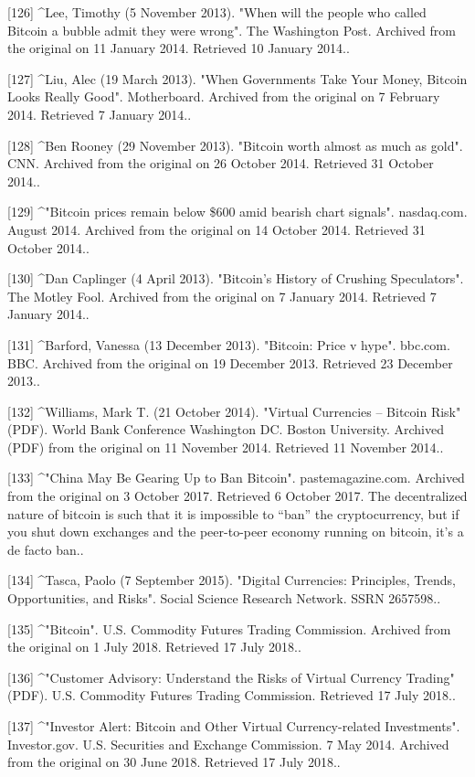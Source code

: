 [126]
^Lee, Timothy (5 November 2013). "When will the people who called Bitcoin a bubble admit they were wrong". The Washington Post. Archived from the original on 11 January 2014. Retrieved 10 January 2014..

[127]
^Liu, Alec (19 March 2013). "When Governments Take Your Money, Bitcoin Looks Really Good". Motherboard. Archived from the original on 7 February 2014. Retrieved 7 January 2014..

[128]
^Ben Rooney (29 November 2013). "Bitcoin worth almost as much as gold". CNN. Archived from the original on 26 October 2014. Retrieved 31 October 2014..

[129]
^"Bitcoin prices remain below \$600 amid bearish chart signals". nasdaq.com. August 2014. Archived from the original on 14 October 2014. Retrieved 31 October 2014..

[130]
^Dan Caplinger (4 April 2013). "Bitcoin's History of Crushing Speculators". The Motley Fool. Archived from the original on 7 January 2014. Retrieved 7 January 2014..

[131]
^Barford, Vanessa (13 December 2013). "Bitcoin: Price v hype". bbc.com. BBC. Archived from the original on 19 December 2013. Retrieved 23 December 2013..

[132]
^Williams, Mark T. (21 October 2014). "Virtual Currencies – Bitcoin Risk" (PDF). World Bank Conference Washington DC. Boston University. Archived (PDF) from the original on 11 November 2014. Retrieved 11 November 2014..

[133]
^"China May Be Gearing Up to Ban Bitcoin". pastemagazine.com. Archived from the original on 3 October 2017. Retrieved 6 October 2017. The decentralized nature of bitcoin is such that it is impossible to “ban” the cryptocurrency, but if you shut down exchanges and the peer-to-peer economy running on bitcoin, it's a de facto ban..

[134]
^Tasca, Paolo (7 September 2015). "Digital Currencies: Principles, Trends, Opportunities, and Risks". Social Science Research Network. SSRN 2657598..

[135]
^"Bitcoin". U.S. Commodity Futures Trading Commission. Archived from the original on 1 July 2018. Retrieved 17 July 2018..

[136]
^"Customer Advisory: Understand the Risks of Virtual Currency Trading" (PDF). U.S. Commodity Futures Trading Commission. Retrieved 17 July 2018..

[137]
^"Investor Alert: Bitcoin and Other Virtual Currency-related Investments". Investor.gov. U.S. Securities and Exchange Commission. 7 May 2014. Archived from the original on 30 June 2018. Retrieved 17 July 2018..

